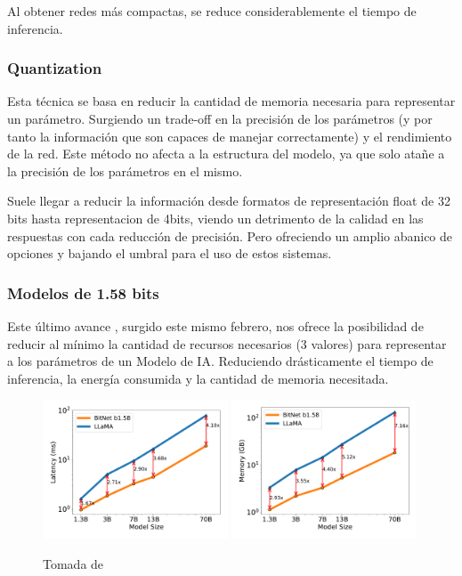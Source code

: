 Al obtener redes más compactas, se reduce considerablemente el tiempo de inferencia.

\subsubsection{Quantization}

Esta técnica se basa en reducir la cantidad de memoria necesaria para representar un parámetro.  Surgiendo un trade-off en la precisión de los parámetros (y por tanto la información que son capaces de manejar correctamente) y el rendimiento de la red. Este método no afecta a la estructura del modelo, ya que solo atañe a la precisión de los parámetros en el mismo.

Suele llegar a reducir la información desde formatos de representación float de 32 bits hasta representacion de 4bits, viendo un detrimento de la calidad en las respuestas con cada reducción de precisión. Pero ofreciendo un amplio abanico de opciones y bajando el umbral para el uso de estos sistemas.

\subsubsection{Modelos de 1.58 bits}

Este último avance \cite{ma2024era}, surgido este mismo febrero, nos ofrece la posibilidad de reducir al mínimo la cantidad de recursos necesarios (3 valores) para representar a los parámetros de un Modelo de IA. Reduciendo drásticamente el tiempo de inferencia, la energía consumida y la cantidad de memoria necesitada.

\begin{figure}[thb]
    \centering
    \includegraphics[width=0.49\textwidth]{Imagenes/Vectorial/plot-latencia.pdf}
    \includegraphics[width=0.49\textwidth]{Imagenes/Vectorial/plot-memoria.pdf}
    \caption{Tomada de \cite{ma2024era}}
    \label{fig:latencia-memoria}
\end{figure}

